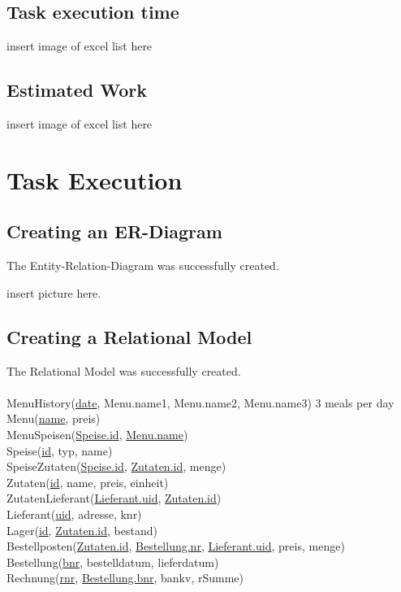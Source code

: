 \documentclass[11pt,a4paper]{article}
\begin{document}
\subsection{Task execution time}
insert image of excel list here
\subsection{Estimated Work}
insert image of excel list here

\newpage
\section{Task Execution}
\subsection{Creating an ER-Diagram}
The Entity-Relation-Diagram was successfully created.

insert picture here.

\subsection{Creating a Relational Model}
The Relational Model was successfully created. \\ \\ MenuHistory(\underline{date}, Menu.name1, Menu.name2, Menu.name3) 3 meals per day \\
Menu(\underline{name}, preis) \\
MenuSpeisen(\underline{Speise.id}, \underline{Menu.name}) \\
Speise(\underline{id}, typ, name) \\
SpeiseZutaten(\underline{Speise.id}, \underline{Zutaten.id}, menge) \\
Zutaten(\underline{id}, name, preis, einheit) \\
ZutatenLieferant(\underline{Lieferant.uid}, \underline{Zutaten.id}) \\
Lieferant(\underline{uid}, adresse, knr) \\
Lager(\underline{id}, \underline{Zutaten.id}, bestand) \\
Bestellposten(\underline{Zutaten.id}, \underline{Bestellung.nr}, \underline{Lieferant.uid}, preis, menge) \\
Bestellung(\underline{bnr}, bestelldatum, lieferdatum) \\
Rechnung(\underline{rnr}, \underline{Bestellung.bnr}, bankv, rSumme) \\
\end{document}
